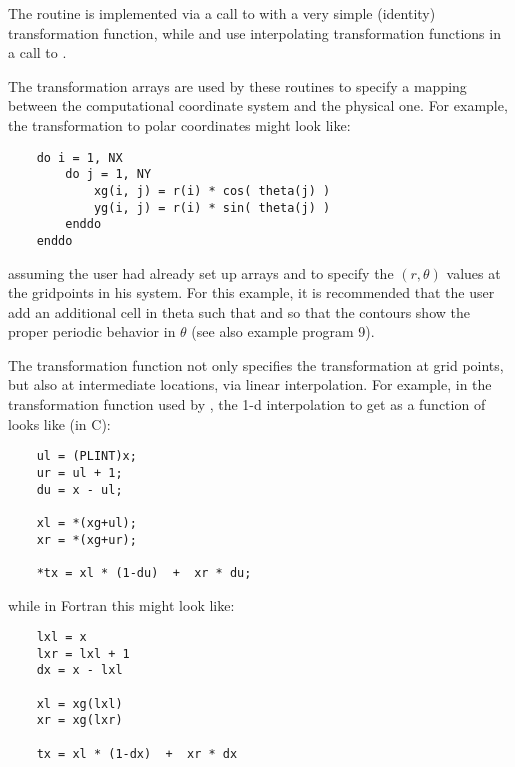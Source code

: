 
The  routine is implemented via a call to 
with a very simple (identity) transformation function, while
 and  use interpolating transformation
functions in a call to .

The transformation arrays are used by these routines to specify a
mapping between the computational coordinate system and the physical
one.  For example, the transformation to polar coordinates might look
like:

\begin{verbatim}
    do i = 1, NX
        do j = 1, NY
            xg(i, j) = r(i) * cos( theta(j) )
            yg(i, j) = r(i) * sin( theta(j) )
        enddo
    enddo
\end{verbatim}

assuming the user had already set up arrays  and  to
specify the $(r, \theta)$ values at the gridpoints in his system.  For this
example, it is recommended that the user add an additional cell in theta
such that  and  so
that the contours show the proper periodic behavior in $\theta$ (see also
example program 9).

The transformation function not only specifies the transformation at grid
points, but also at intermediate locations, via linear interpolation.  For
example, in the  transformation function used by , 
the 1-d interpolation to get  as a function of  
looks like (in C):

\begin{verbatim}
    ul = (PLINT)x;
    ur = ul + 1;
    du = x - ul;

    xl = *(xg+ul);
    xr = *(xg+ur);

    *tx = xl * (1-du)  +  xr * du;
\end{verbatim}

while in Fortran this might look like:

\begin{verbatim}
    lxl = x
    lxr = lxl + 1
    dx = x - lxl

    xl = xg(lxl)
    xr = xg(lxr)

    tx = xl * (1-dx)  +  xr * dx
\end{verbatim}
